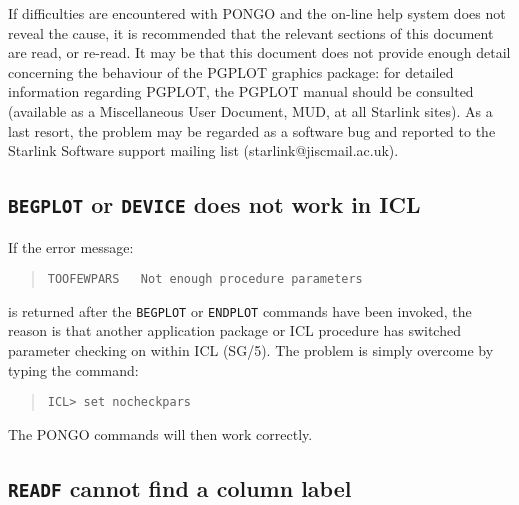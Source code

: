 \documentclass[twoside,11pt]{article}
\newcommand{\htmlref}[2]{#1}
\newcommand{\xref}[3]{#1}
\renewcommand{\_}{\texttt{\symbol{95}}}
\newcommand{\cnam}[1]{{\tt #1}}
\newcommand{\iref} [1]{\htmlref{#1}{#1}}
\begin{document}
If difficulties are encountered with PONGO and the on-line help system
does not reveal the cause, it is recommended that the relevant
sections of this document are read, or re-read.  It may be that this
document does not provide enough detail concerning the behaviour of
the PGPLOT graphics package: for detailed information regarding
PGPLOT, the PGPLOT manual should be consulted (available as a
Miscellaneous User Document, MUD, at all Starlink sites).  As a last
resort, the problem may be regarded as a software bug and reported to
the Starlink Software support mailing list (starlink@jiscmail.ac.uk).


\subsection{\cnam{BEGPLOT} or \cnam{DEVICE} does not work in ICL}

If the error message:
\begin{quote}
\begin{verbatim}
TOOFEWPARS   Not enough procedure parameters
\end{verbatim}
\end{quote}
is returned after the \cnam{\iref{BEGPLOT}} or \cnam{\iref{ENDPLOT}}
commands have been invoked, the reason is that another application
package or ICL procedure has switched parameter checking on within ICL
\xref{(SG/5)}{sg5}{}.  The problem is simply overcome by typing the command:
\begin{quote}
\begin{verbatim}
ICL> set nocheckpars
\end{verbatim}
\end{quote}
The PONGO commands will then work correctly.

\subsection{\cnam{READF} cannot find a column label}
\end{document}
